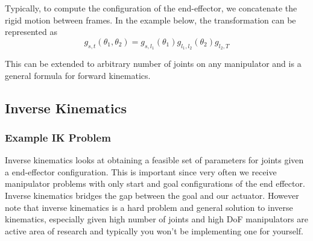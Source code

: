 \documentclass[letterpaper]{article}
\begin{document}
Typically, to compute the configuration of the end-effector, we concatenate the
rigid motion between frames.
In the example below, the transformation can be represented as 
\begin{equation} \label{eqn:fk}
  g_{s,t}(\theta_1, \theta_2) = g_{s, l_1}\left(\theta_1\right)g_{l_1, l_2}(\theta_2)g_{l_2, T}
\end{equation}

This can be extended to arbitrary number of joints on any manipulator and is a 
general formula for forward kinematics. 

\subsection{Inverse Kinematics}
\subsubsection{Example IK Problem}
Inverse kinematics looks at obtaining a feasible set of parameters for joints
given a end-effector configuration. This is important since very often we receive
manipulator problems with only start and goal configurations of the end effector.
Inverse kinematics bridges the gap between the goal and our actuator. 
However note that inverse kinematics is a hard problem and general solution to
inverse kinematics, especially given high number of joints and high DoF manipulators
are active area of research and typically you won't be implementing one for yourself.
\end{document}
